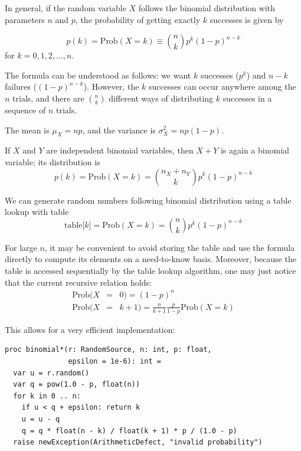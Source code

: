 \documentclass[justified, sixbynine]{tufte-book}
\def\ft{\small\tt}
\theoremstyle{plain}%
\newtheorem * {corollary}{Corollary}
\theoremstyle{definition}
\theoremstyle{remark}
\newtheorem * {remark}{Remark}
\newtheorem * {note}{Note}
\begin{document}
\begin{fullwidth}
In general, if the random variable $X$ follows the binomial distribution with
parameters $n$ and $p$, the probability of getting exactly $k$ successes is
given by

\begin{equation}
p(k)=\textrm{Prob}(X=k) \equiv  \binom nkp^k(1-p)^{n-k}
\end{equation}
for $k=0, 1, 2, ..., n$.

The formula can be understood as follows: we want $k$ successes ($p^k$) and $%
n-k$ failures ($(1-p)^{n-k}$). However, the $k$ successes can occur anywhere
among the $n$ trials, and there are $\binom nk$ different ways of distributing
$k$ successes in a sequence of $n$ trials.

The mean is $\mu _X=np$, and the variance is $\sigma _X^2=np(1-p)$.

If $X$ and $Y$ are independent binomial variables, then $X+Y$ is again a
binomial variable; its distribution is
\begin{equation}
p(k)=\textrm{Prob}(X=k)=\binom{n_X+n_Y}kp^k(1-p)^{n-k}
\end{equation}

We can generate random numbers following binomial distribution using a table lookup with table
\begin{equation}
\text{table[}k\text{]}=\textrm{Prob}(X=k)=\binom nkp^k(1-p)^{n-k}
\end{equation}

For large $n$, it may be convenient to avoid storing the table and use the
formula directly to compute its elements on a need-to-know basis.
Moreover, because the table is accessed sequentially by the
table lookup algorithm, one may just notice that the current recursive relation holds:
\begin{eqnarray}
\textrm{Prob}(X &=&0)=(1-p)^n \\
\textrm{Prob}(X &=&k+1)=\frac n{k+1}\frac p{1-p}\textrm{Prob}(X=k)
\end{eqnarray}

This allows for a very efficient implementation:

\begin{lstlisting}[caption={in file: {\ft nlib/randomgen.nim}}]
proc binomial*(r: RandomSource, n: int, p: float,
               epsilon = 1e-6): int =
  var u = r.random()
  var q = pow(1.0 - p, float(n))
  for k in 0 .. n:
    if u < q + epsilon: return k
    u = u - q
    q = q * float(n - k) / float(k + 1) * p / (1.0 - p)
  raise newException(ArithmeticDefect, "invalid probability")
\end{lstlisting}


\end{fullwidth}
\end{document}

